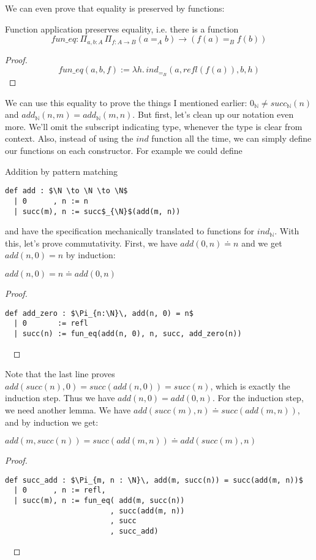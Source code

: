 \documentclass[a4paper, 12pt]{article}
\newcommand{\N}{\mathbb{N}}
\newcommand{\la}[1]{\lambda{#1}.\,}
\theoremstyle{changedot}
\theoremstyle{changedotbreak}
\theoremstyle{nonumberplain}
\newtheorem{proof}{Proof}
\begin{document}
We can even prove that equality is preserved by functions:
\begin{theorem}
  Function application preserves equality, i.e. there is a function
  \[\mathit{fun\_eq} : \Pi_{a, b: A}\, \Pi_{f : A \to B} (a =_{A} b) \to (f(a) =_{B} f(b))\]
\end{theorem}
\begin{proof}
  \[\mathit{fun\_eq}(a, b, f) := \la h ind_{=_{B}}(a, refl(f(a)), b, h)\]
\end{proof}

We can use this equality to prove the things I mentioned earlier: $0_{\N} \neq succ_{\N}(n)$ and $add_{\N}(n, m) = add_{\N}(m, n)$. But first, let's clean up our notation even more. We'll omit the subscript indicating type, whenever the type is clear from context. Also, instead of using the $ind$ function all the time, we can simply define our functions on each constructor. For example we could define
\begin{definition} Addition by pattern matching
\begin{lstlisting}[mathescape=true]
  def add : $\N \to \N \to \N$
  | 0      , n := n
  | succ(m), n := succ$_{\N}$(add(m, n))
\end{lstlisting}
\end{definition}

and have the specification mechanically translated to functions for $ind_{\N}$. With this, let's prove commutativity. First, we have $add(0, n) \doteq n$ and we get $add(n, 0) = n$ by induction:

\begin{lemma}
  $add(n, 0) = n \doteq add(0, n)$
\end{lemma}
\begin{proof} ~
\begin{lstlisting}[mathescape=true]
  def add_zero : $\Pi_{n:\N}\, add(n, 0) = n$
  | 0       := refl
  | succ(n) := fun_eq(add(n, 0), n, succ, add_zero(n))
\end{lstlisting}~
\end{proof}

Note that the last line proves $add(succ(n), 0) = succ(add(n, 0)) = succ(n)$, which is exactly the induction step. Thus we have $add(n, 0) = add(0, n)$. For the induction step, we need another lemma. We have $add(succ(m), n) \doteq succ(add(m, n))$, and by induction we get:

\begin{lemma}
  $add(m, succ(n)) = succ(add(m, n)) \doteq add(succ(m), n)$
\end{lemma}
\begin{proof}~
\begin{lstlisting}[mathescape=true]
  def succ_add : $\Pi_{m, n : \N}\, add(m, succ(n)) = succ(add(m, n))$
  | 0      , n := refl,
  | succ(m), n := fun_eq( add(m, succ(n))
                        , succ(add(m, n))
                        , succ
                        , succ_add)
\end{lstlisting}~
\end{proof}
\end{document}
